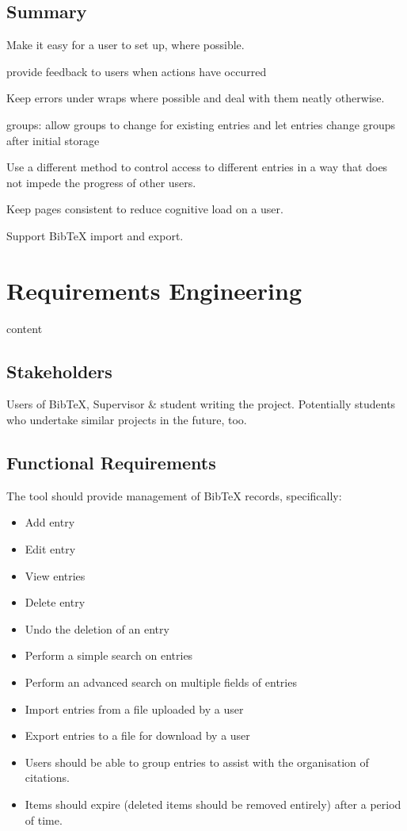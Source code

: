 \documentclass{l4proj}
\newcommand{\BibTeX}{B{\sc ib}\TeX}
\newcommand{\bibtex}{\BibTeX}
\begin{document}
\section{Summary}
Make it easy for a user to set up, where possible.

provide feedback to users when actions have occurred 

Keep errors under wraps where possible and deal with them neatly otherwise.

groups: allow groups to change for existing entries and let entries change groups after initial storage

Use a different method to control access to different entries in a way that does not impede the progress of other users.

Keep pages consistent to reduce cognitive load on a user.

Support \bibtex{} import and export.



\chapter{Requirements Engineering}
\label{reqs}
content

\section{Stakeholders}
Users of \bibtex, Supervisor \& student writing the project. Potentially students who undertake similar projects in the future, too.

\section{Functional Requirements}
The tool should provide management of BibTeX records, specifically:
\begin{itemize}
\item Add entry
\item Edit entry
\item View entries
\item Delete entry
\item Undo the deletion of an entry
\item Perform a simple search on entries
\item Perform an advanced search on multiple fields of entries
\item Import entries from a file uploaded by a user
\item Export entries to a file for download by a user
\item Users should be able to group entries to assist with the organisation of citations.
\item Items should expire (deleted items should be removed entirely) after a period of time.
\end{itemize}
\end{document}
